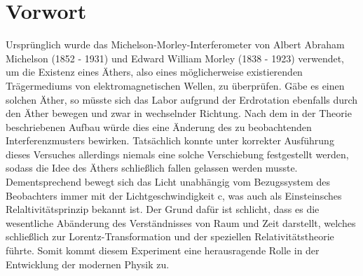 \section{Vorwort}
Ursprünglich wurde das Michelson-Morley-Interferometer von Albert Abraham Michelson (1852 - 1931) und Edward William 
Morley (1838 - 1923) verwendet, um die Existenz eines Äthers, also eines möglicherweise existierenden Trägermediums von elektromagnetischen Wellen, 
zu überprüfen. Gäbe es einen solchen Äther, so müsste sich das Labor aufgrund der Erdrotation ebenfalls durch den Äther 
bewegen und zwar in wechselnder Richtung. Nach dem in der Theorie beschriebenen Aufbau würde dies eine Änderung des zu 
beobachtenden Interferenzmusters bewirken. Tatsächlich konnte unter korrekter Ausführung dieses Versuches allerdings 
niemals eine solche Verschiebung festgestellt werden, sodass die Idee des Äthers schließlich fallen gelassen werden 
musste. Dementsprechend bewegt sich das Licht unabhängig vom Bezugssystem des Beobachters immer mit der 
Lichtgeschwindigkeit c, was auch als Einsteinsches Relaltivitätsprinzip bekannt ist. Der Grund dafür ist schlicht, 
dass es die wesentliche Abänderung des Verständnisses von Raum und Zeit darstellt, welches schließlich zur 
Lorentz-Transformation und der speziellen Relativitätstheorie führte. Somit kommt diesem Experiment eine herausragende Rolle 
in der Entwicklung der modernen Physik zu. 
